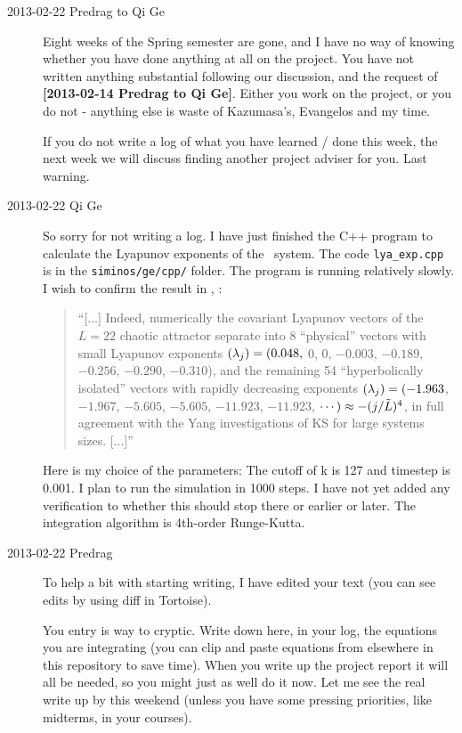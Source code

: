 \begin{description}
\item[2013-02-22 Predrag to Qi Ge] Eight weeks of the Spring semester
are gone, and I have no way of knowing whether you have done anything
at all on the project. You have not written anything substantial
following our discussion, and the request  of {\bf [2013-02-14
Predrag to Qi Ge]}. Either you work on the project, or you do not -
anything else is waste of Kazumasa's, Evangelos and my time.

If you do not write a log of what you have learned / done this week,
the next week we will discuss finding another project adviser for
you. Last warning.

\item[2013-02-22 Qi Ge] So sorry for not writing a log. I have just
finished the C++ program to calculate the Lyapunov exponents of the
\KS\ system. The code \texttt{lya\_exp.cpp} is in the
\texttt{siminos/ge/cpp/} folder. The program is running relatively
slowly. I wish to confirm the result in ,
:

\begin{quote}
``[...] Indeed, numerically the covariant Lyapunov
vectors of the $L=22$ chaotic attractor separate
into 8 ``physical'' vectors with small Lyapunov exponents
$(\lambda_j) = (0.048,$ 0, 0, $-0.003$, $-0.189$, $-0.256$,
$-0.290$, $-0.310$),
and the remaining 54 ``hyperbolically isolated'' vectors with rapidly
decreasing exponents
$(\lambda_j) = (-1.963$,   $-1.967$,   $-5.605$,   $-5.605$,  $-11.923$,  $-11.923$,
 $\cdots) \approx -(j/\tilde{L})^4$,
in full agreement with the Yang \etal{} investigations
of KS for large systems sizes.
 [...]''
\end{quote}

    Here is my choice of the parameters:
    The cutoff of k is 127 and timestep is 0.001. I plan to run the
    simulation in 1000 steps. I have not yet added any
    verification to whether this should stop there or earlier or
    later. The integration algorithm is 4th-order Runge-Kutta.

\item[2013-02-22 Predrag] To help a bit with starting writing, I have
edited your text (you can see edits by using diff in Tortoise).

You entry is way to cryptic. {\color{red} Write down here}, in your
log, the equations you are integrating (you can clip and paste
equations from elsewhere in this repository to save time). When you
write up the project report it will all be needed, so you might just
as well do it now. Let me see the real write up by this weekend
(unless you have some pressing priorities, like midterms, in your
courses).


\end{description}
